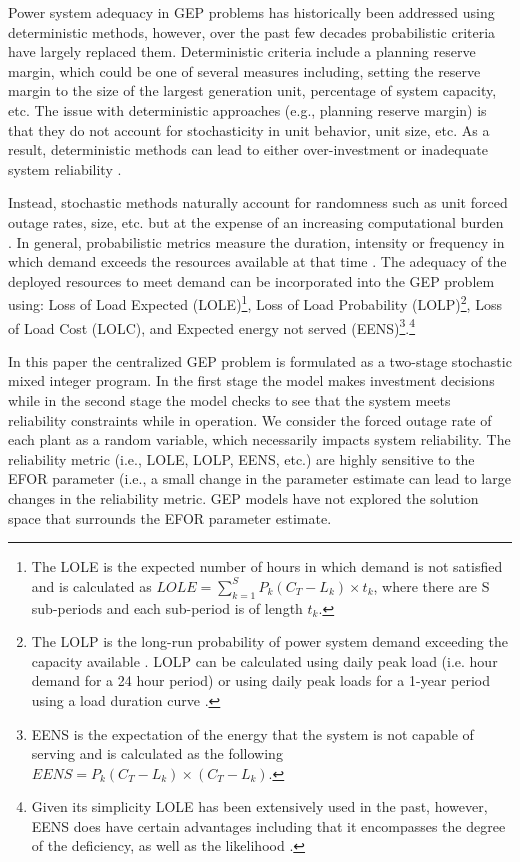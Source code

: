 \documentclass[10pt]{amsart}
\begin{document}
Power system adequacy in GEP problems has historically been addressed using deterministic methods, however, over the past few decades probabilistic criteria have largely replaced them.
Deterministic criteria include a planning reserve margin, which could be one of several measures including, setting the reserve margin to the size of the largest generation unit, percentage of system capacity, etc. 
The issue with deterministic approaches (e.g., planning reserve margin) is that they do not account for stochasticity in unit behavior, unit size, etc.
As a result, deterministic methods can lead to either over-investment or inadequate system reliability \parencite{aghaei:2013aa}.

Instead, stochastic methods naturally account for randomness such as unit forced outage rates, size, etc. but at the expense of an increasing computational burden \parencite{aghaei:2013aa}.  
In general, probabilistic metrics measure the duration, intensity or frequency in which demand exceeds the resources available at that time \parencite{dragoon:2006aa}.  	
The adequacy of the deployed resources to meet demand can be incorporated into the GEP problem using: Loss of Load Expected (LOLE)\footnote{The LOLE is the expected number of hours in which demand is not satisfied and is calculated as $LOLE = \sum_{k=1}^S P_k\left(C_T - L_k \right)\times t_k$, where there are S sub-periods and each sub-period is of length $t_k$.}, Loss of Load Probability (LOLP)\footnote{The LOLP is the long-run probability of power system demand exceeding the capacity available \parencite{endrenyi:1978}.  
LOLP can be calculated using daily peak load (i.e. hour demand for a 24 hour period) or using daily peak loads for a 1-year period using a load duration curve \parencite{endrenyi:1978}.}, Loss of Load Cost (LOLC), and Expected energy not served (EENS)\footnote{EENS is the expectation of the energy that the system is not capable of serving and is calculated as the following $EENS = P_k \left(C_T - L_k \right)\times \left(C_T- L_k \right)$.}.\footnote{Given its simplicity LOLE has been extensively used in the past, however, EENS does have certain advantages including that it encompasses the degree of the deficiency, as well as the likelihood \parencite[p622]{murugan2009nsga}.}

In this paper the centralized GEP problem is formulated as a two-stage stochastic mixed integer program.
In the first stage the model makes investment decisions while in the second stage the model checks to see that the system meets reliability constraints while in operation. 
We consider the forced outage rate of each plant as a random variable, which necessarily impacts system reliability. 
The reliability metric (i.e., LOLE, LOLP, EENS, etc.) are highly sensitive to the EFOR parameter (i.e., a small change in the parameter estimate can lead to large changes in the reliability metric. 
GEP models have not explored the solution space that surrounds the EFOR parameter estimate. 
\end{document}
